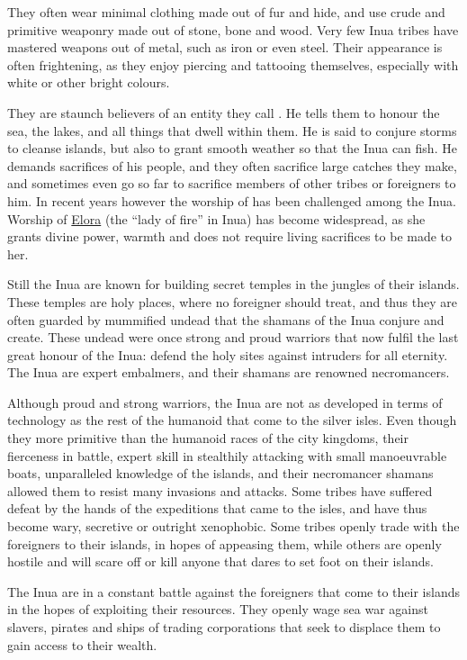 They often wear minimal clothing made out of fur and hide, and use crude and
primitive weaponry made out of stone, bone and wood. Very few Inua tribes have
mastered weapons out of metal, such as iron or even steel. Their appearance is
often frightening, as they enjoy piercing and tattooing themselves, especially
with white or other bright colours.

They are staunch believers of an entity they call .
He tells them to honour the sea, the lakes, and all things that dwell within
them. He is said to conjure storms to cleanse islands, but also to grant
smooth weather so that the Inua can fish. He demands sacrifices of his people,
and they often sacrifice large catches they make, and sometimes even go so
far to sacrifice members of other tribes or foreigners to him. In recent years
however the worship of  has been challenged among the
Inua. Worship of \hyperref[sec:Forun]{Elora} (the ``lady of fire'' in Inua)
has become widespread, as she grants divine power, warmth and does not require
living sacrifices to be made to her.

Still the Inua are known for building secret temples in the jungles of their
islands. These temples are holy places, where no foreigner should treat, and
thus they are often guarded by mummified undead that the shamans of the Inua
conjure and create. These undead were once strong and proud warriors that
now fulfil the last great honour of the Inua: defend the holy sites against
intruders for all eternity. The Inua are expert embalmers, and their shamans
are renowned necromancers.

Although proud and strong warriors, the Inua are not as developed in terms of
technology as the rest of the humanoid that come to the silver isles.  Even
though they more primitive than the humanoid races of the city kingdoms, their
fierceness in battle, expert skill in stealthily attacking with small
manoeuvrable boats, unparalleled knowledge of the islands, and their
necromancer shamans allowed them to resist many invasions and attacks. Some
tribes have suffered defeat by the hands of the expeditions that came to the
isles, and have thus become wary, secretive or outright xenophobic. Some
tribes openly trade with the foreigners to their islands, in hopes of
appeasing them, while others are openly hostile and will scare off or kill
anyone that dares to set foot on their islands.

The Inua are in a constant battle against the foreigners that come to their
islands in the hopes of exploiting their resources. They openly wage sea
war against slavers, pirates and ships of trading corporations that seek
to displace them to gain access to their wealth.
